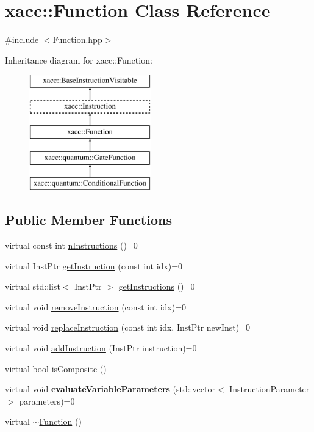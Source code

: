\hypertarget{a00030}{}\section{xacc\+:\+:Function Class Reference}
\label{a00030}


{\ttfamily \#include $<$Function.\+hpp$>$}

Inheritance diagram for xacc\+:\+:Function\+:\begin{figure}[H]
\begin{center}
\leavevmode
\includegraphics[height=5.000000cm]{a00030}
\end{center}
\end{figure}
\subsection*{Public Member Functions}
\begin{DoxyCompactItemize}
\item 
virtual const int \hyperlink{a00030_a8901985525f59713e14c61713e07c086}{n\+Instructions} ()=0
\item 
virtual Inst\+Ptr \hyperlink{a00030_afa549fc91b5a05f26d8139954a7e0ed5}{get\+Instruction} (const int idx)=0
\item 
virtual std\+::list$<$ Inst\+Ptr $>$ \hyperlink{a00030_aaf80bd3d49113a92b520785572663032}{get\+Instructions} ()=0
\item 
virtual void \hyperlink{a00030_ab6478b09bb28e194bb555b3180737733}{remove\+Instruction} (const int idx)=0
\item 
virtual void \hyperlink{a00030_a2ef6a4923a6734f90f6ee3d94d263af0}{replace\+Instruction} (const int idx, Inst\+Ptr new\+Inst)=0
\item 
virtual void \hyperlink{a00030_aa8c9ec2d08be75c69399d4254b0216f5}{add\+Instruction} (Inst\+Ptr instruction)=0
\item 
virtual bool \hyperlink{a00030_aa75500c657b5c3e0e36213e1506aad97}{is\+Composite} ()
\item 
virtual void {\bfseries evaluate\+Variable\+Parameters} (std\+::vector$<$ Instruction\+Parameter $>$ parameters)=0\hypertarget{a00030_af6ae9453027789a2aaec30e59c9e45e3}{}\label{a00030_af6ae9453027789a2aaec30e59c9e45e3}

\item 
virtual \hyperlink{a00030_a04b25ba4da1ddfa4ec4ec6d6ffb25bc3}{$\sim$\+Function} ()
\end{DoxyCompactItemize}
